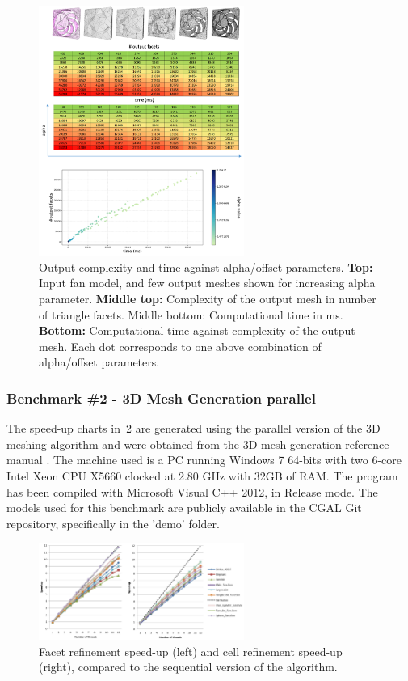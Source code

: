 \begin{figure}[htb]
    \centering
    \includegraphics[width=0.6\textwidth]{graphics/cgal/fan.png} 
    \caption{Output complexity and time against alpha/offset parameters.
\textbf{Top:} Input fan model, and few output meshes shown for increasing alpha parameter. \textbf{Middle top:} Complexity of the output mesh in number of triangle
facets. Middle bottom: Computational time in ms. \textbf{Bottom:} Computational time against complexity of the output mesh. Each dot corresponds to one above combination of alpha/offset parameters.}
\label{WP1::CGAL::aw3}
\end{figure}



\subsubsection{Benchmark \#2 - 3D Mesh Generation parallel}


The speed-up charts in~\cref{WP1::CGAL::mg3parallel} are generated using the parallel version of the 3D meshing algorithm and were obtained from the 3D mesh generation reference manual \cite{alliez_3d_2024}. 
The machine used is a PC running Windows 7 64-bits with two 6-core Intel Xeon CPU X5660 clocked at 2.80 GHz with 32GB of RAM. 
The program has been compiled with Microsoft Visual C++ 2012, in Release mode.
The models used for this benchmark are publicly available in the CGAL Git repository, specifically in the 'demo' folder.


\begin{figure}[htb]
    \centering
    \includegraphics[width=0.6\textwidth]{graphics/cgal/refinement_speedup.png} 
    \caption{Facet refinement speed-up (left) and cell refinement speed-up (right), compared to the sequential version of the algorithm.}
    \label{WP1::CGAL::mg3parallel}
\end{figure}


